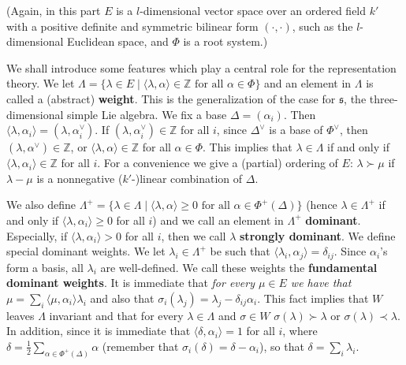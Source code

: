 \documentclass{article}
\newcommand{\InZ}{\mathbb{Z}}
\newcommand{\SBar}{\;|\;}
\newcommand{\lie}[1]{\mathfrak{#1}}
\begin{document}
(Again, in this part $E$ is a $l$-dimensional vector space over an ordered field $k'$ with a positive definite and symmetric bilinear form $(\cdot, \cdot)$, such as the $l$-dimensional Euclidean space, and $\Phi$ is a root system.)

We shall introduce some features which play a central role for the representation theory.
We let $\Lambda = \{\lambda \in E \SBar \langle \lambda, \alpha \rangle \in \InZ \textrm{ for all $\alpha \in \Phi$}\}$ and an element in $\Lambda$ is called a (abstract) \textbf{weight}.
This is the generalization of the case for $\lie{s}$, the three-dimensional simple Lie algebra.
We fix a base $\Delta = (\alpha_i)$.
Then $\langle \lambda, \alpha_i \rangle = (\lambda, \alpha_i^\vee)$.
If $(\lambda, \alpha_i^\vee) \in \InZ$ for all $i$, since $\Delta^\vee$ is a base of $\Phi^\vee$, then $(\lambda, \alpha^\vee) \in \InZ$, or $\langle \lambda, \alpha \rangle \in \InZ$ for all $\alpha \in \Phi$.
This implies that $\lambda \in \Lambda$ if and only if $\langle \lambda, \alpha_i \rangle \in \InZ$ for all $i$.
For a convenience we give a (partial) ordering of $E$: $\lambda \succ \mu$ if $\lambda - \mu$ is a nonnegative ($k'$-)linear combination of $\Delta$.

We also define $\Lambda^+ = \{\lambda \in \Lambda \SBar \langle \lambda, \alpha \rangle \ge 0 \textrm{ for all $\alpha \in \Phi^+(\Delta)$}\}$ (hence $\lambda \in \Lambda^+$ if and only if $\langle \lambda, \alpha_i \rangle \ge 0$ for all $i$) and we call an element in $\Lambda^+$ \textbf{dominant}.
Especially, if $\langle \lambda, \alpha_i \rangle > 0$ for all $i$, then we call $\lambda$ \textbf{strongly dominant}.
We define special dominant weights.
We let $\lambda_i \in \Lambda^+$ be such that $\langle \lambda_i, \alpha_j \rangle = \delta_{ij}$.
Since $\alpha_i$'s form a basis, all $\lambda_i$ are well-defined.
We call these weights the \textbf{fundamental dominant weights}.
It is immediate that \textit{for every $\mu \in E$ we have that $\mu = \sum_i \langle \mu, \alpha_i \rangle \lambda_i$} and also that $\sigma_i(\lambda_j) = \lambda_j - \delta_{ij} \alpha_i$.
This fact implies that $W$ leaves $\Lambda$ invariant and that for every $\lambda \in \Lambda$ and $\sigma \in W$ $\sigma(\lambda) \succ \lambda$ or $\sigma(\lambda) \prec \lambda$.
In addition, since it is immediate that $\langle \delta, \alpha_i \rangle = 1$ for all $i$, where $\delta = \frac{1}{2} \sum_{\alpha \in \Phi^+(\Delta)} \alpha$ (remember that $\sigma_i(\delta) = \delta - \alpha_i$), so that $\delta = \sum_i \lambda_i$.
\end{document}
